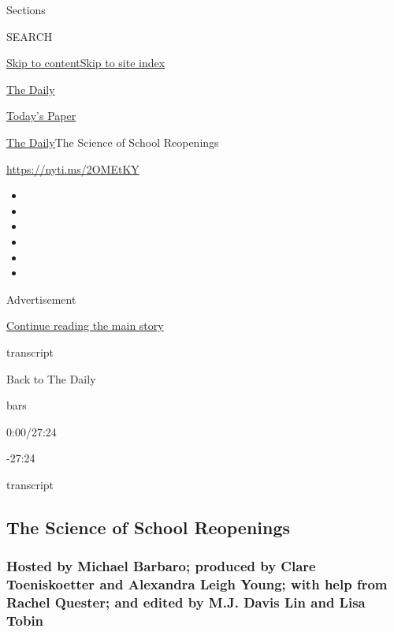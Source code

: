 Sections

SEARCH

\protect\hyperlink{site-content}{Skip to
content}\protect\hyperlink{site-index}{Skip to site index}

\href{https://www.nytimes.com/podcasts/the-daily}{The Daily}

\href{https://myaccount.nytimes.com/auth/login?response_type=cookie\&client_id=vi}{}

\href{https://www.nytimes.com/section/todayspaper}{Today's Paper}

\href{/podcasts/the-daily}{The Daily}\textbar{}The Science of School
Reopenings

\url{https://nyti.ms/2OMEtKY}

\begin{itemize}
\item
\item
\item
\item
\item
\item
\end{itemize}

Advertisement

\protect\hyperlink{after-top}{Continue reading the main story}

transcript

Back to The Daily

bars

0:00/27:24

-27:24

transcript

\hypertarget{the-science-of-school-reopenings}{%
\subsection{The Science of School
Reopenings}\label{the-science-of-school-reopenings}}

\hypertarget{hosted-by-michael-barbaro-produced-by-clare-toeniskoetter-and-alexandra-leigh-young-with-help-from-rachel-quester-and-edited-by-mj-davis-lin-and-lisa-tobin}{%
\subsubsection{Hosted by Michael Barbaro; produced by Clare
Toeniskoetter and Alexandra Leigh Young; with help from Rachel Quester;
and edited by M.J. Davis Lin and Lisa
Tobin}\label{hosted-by-michael-barbaro-produced-by-clare-toeniskoetter-and-alexandra-leigh-young-with-help-from-rachel-quester-and-edited-by-mj-davis-lin-and-lisa-tobin}}

